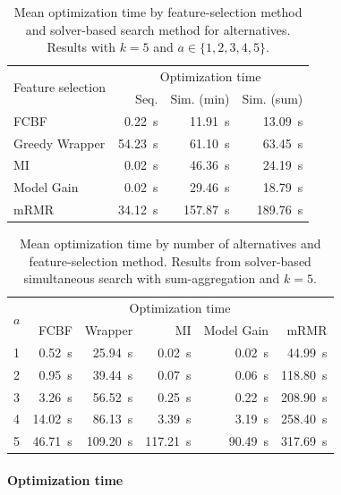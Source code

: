 \documentclass{article}
\theoremstyle{definition}
\begin{document}
\begin{table}[t]
	\centering
	\begin{tabular}{lrrr}
		\toprule
		\multirow{2}{*}{Feature selection} & \multicolumn{3}{c}{Optimization time} \\
		\cmidrule(lr){2-4}
		& Seq. & Sim. (min) & Sim. (sum) \\
		\midrule
		FCBF & 0.22~s & 11.91~s & 13.09~s \\
		Greedy Wrapper & 54.23~s & 61.10~s & 63.45~s \\
		MI & 0.02~s & 46.36~s & 24.19~s \\
		Model Gain & 0.02~s & 29.46~s & 18.79~s \\
		mRMR & 34.12~s & 157.87~s & 189.76~s \\
		\bottomrule
	\end{tabular}
	\caption{
		Mean optimization time by feature-selection method and solver-based search method for alternatives.
		Results with $k=5$ and $a \in \{1,2,3,4,5\}$.
	}
	\label{tab:afs:impact-search-fs-method-optimization-time}
\end{table}

\begin{table}[t]
	\centering
	\begin{tabular}{lrrrrr}
		\toprule
		\multirow{2}{*}{$a$} & \multicolumn{5}{c}{Optimization time} \\
		\cmidrule(lr){2-6}
		& FCBF & Wrapper & MI & Model Gain & mRMR \\
		\midrule
		1 & 0.52~s & 25.94~s & 0.02~s & 0.02~s & 44.99~s \\
		2 & 0.95~s & 39.44~s & 0.07~s & 0.06~s & 118.80~s \\
		3 & 3.26~s & 56.52~s & 0.25~s & 0.22~s & 208.90~s \\
		4 & 14.02~s & 86.13~s & 3.39~s & 3.19~s & 258.40~s \\
		5 & 46.71~s & 109.20~s & 117.21~s & 90.49~s & 317.69~s \\
		\bottomrule
	\end{tabular}
	\caption{
		Mean optimization time by number of alternatives and feature-selection method.
		Results from solver-based simultaneous search with sum-aggregation and $k=5$.
	}
	\label{tab:afs:impact-num-alternatives-fs-method-optimization-time}
\end{table}

\paragraph{Optimization time}
\end{document}
